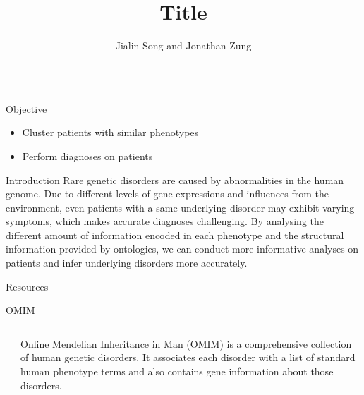 \documentclass[final]{beamer} %
\title[]{{\fontsize{240}{240}\selectfont Title}}
\author[]{Jialin Song and Jonathan Zung}
\institute[University of Toronto]{Computational Biology Lab, University of Toronto}
\begin{document}
  \begin{frame}{}
  \maketitle
    \begin{columns}[T]
      \begin{column}{0.3\linewidth}

     \begin{block}{\Huge Objective}
     \begin{itemize}
    \Large
     \item
     Cluster patients with similar phenotypes
    \item
    Perform diagnoses on patients
     \end{itemize}
      \end{block}

    \begin{block}{\Huge Introduction}
    \Large
    Rare genetic disorders are caused by abnormalities in the human genome. Due to different levels of gene expressions and influences from the environment, even patients with a same underlying disorder may exhibit varying symptoms, which makes accurate diagnoses challenging. By analysing the different amount of information encoded in each phenotype and the structural information provided by ontologies, we can conduct more informative analyses on patients and infer underlying disorders more accurately. 
   \vspace{1cm} 

    \end{block}
    
    \begin{block}{\Huge Resources}
    
    \begin{block}{\Large OMIM}
      \begin{columns}[T]
        \begin{column}{.5\textwidth}
        \end{column}
        
        \begin{column}{.5\textwidth}
        \Large
        Online Mendelian Inheritance in Man (OMIM) is a comprehensive collection of human genetic disorders. It associates each disorder with a list of standard human phenotype terms and also contains gene information about those disorders. 
       \end{column}
    \end{columns}
    \end{block}


\end{block}
\end{column}
\end{columns}
\end{frame}
\end{document}
